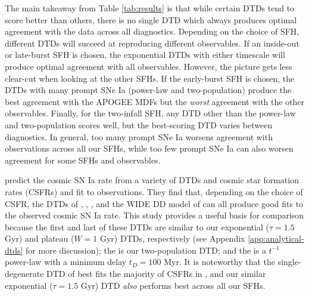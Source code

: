 \documentclass[twocolumn,twocolappendix,linenumbers,trackchanges]{aastex631}
\begin{document}
The main takeaway from Table \ref{tab:results} is that while certain DTDs tend to score better than others, there is no single DTD which always produces optimal agreement with the data across all diagnostics. Depending on the choice of SFH, different DTDs will succeed at reproducing different observables. If an inside-out or late-burst SFH is chosen, the exponential DTDs with either timescale will produce optimal agreement with all observables. However, the picture gets less clear-cut when looking at the other SFHs. If the early-burst SFH is chosen, the DTDs with many prompt SNe Ia (power-law and two-population) produce the best agreement with the APOGEE MDFs but the {\it worst} agreement with the other observables. Finally, for the two-infall SFH, any DTD other than the power-law and two-population scores well, but the best-scoring DTD varies between diagnostics. In general, too many prompt SNe Ia worsens agreement with observations across all our SFHs, while too few prompt SNe Ia can also worsen agreement for some SFHs and observables.

\citet{Palicio2024-CosmicSNIaRate} predict the cosmic SN Ia rate from a variety of DTDs and cosmic star formation rates (CSFRs) and fit to observations. They find that, depending on the choice of CSFR, the DTDs of \citet{MatteucciRecchi2001-SNIaTimescale}, \citet{Mannucci2006-TwoPopulations}, \citet{Totani2008-DTD}, and the WIDE DD model of \citet{Greggio2005-AnalyticalRates} can all produce good fits to the observed cosmic SN Ia rate. This study provides a useful basis for comparison because the first and last of these DTDs are similar to our exponential ($\tau=1.5$ Gyr) and plateau ($W=1$ Gyr) DTDs, respectively (see Appendix \ref{app:analytical-dtds} for more discussion); the \citet{Mannucci2006-TwoPopulations} is our two-population DTD; and the \citet{Totani2008-DTD} is a $t^{-1}$ power-law with a minimum delay $t_D=100$ Myr. It is noteworthy that the single-degenerate DTD of \citet{MatteucciRecchi2001-SNIaTimescale} best fits the majority of CSFRs in \citet{Palicio2024-CosmicSNIaRate}, and our similar exponential ($\tau=1.5$ Gyr) DTD {\it also} performs best across all our SFHs.
\end{document}
